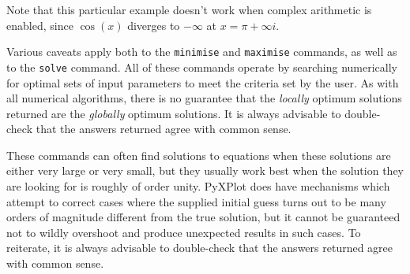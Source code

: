 \vspace{3mm}
\newline
{}\newline
{}\newline
{}\newline
{}
\vspace{3mm}

\noindent Note that this particular example doesn't work when complex
arithmetic is enabled, since $\cos(x)$ diverges to $-\infty$ at $x=\pi+\infty
i$.

Various caveats apply both to the {\tt minimise} and {\tt maximise} commands,
as well as to the {\tt solve} command.  All of these commands operate by
searching numerically for optimal sets of input parameters to meet the criteria
set by the user. As with all numerical algorithms, there is no guarantee that
the {\it locally} optimum solutions returned are the {\it globally} optimum
solutions. It is always advisable to double-check that the answers returned
agree with common sense.

These commands can often find solutions to equations when these solutions are
either very large or very small, but they usually work best when the solution
they are looking for is roughly of order unity.  PyXPlot does have mechanisms
which attempt to correct cases where the supplied initial guess turns out to be
many orders of magnitude different from the true solution, but it cannot be
guaranteed not to wildly overshoot and produce unexpected results in such
cases.  To reiterate, it is always advisable to double-check that the answers
returned agree with common sense.


